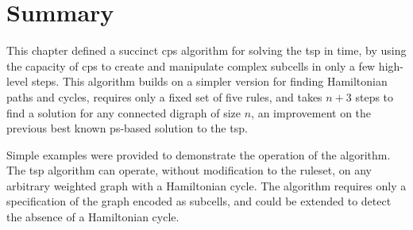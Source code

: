 \section{\label{sec:tsp:conc}Summary}
This chapter defined a succinct \gls{cps} algorithm for solving the \gls{tsp} in  time, by using the capacity of \gls{cps} to create and manipulate complex subcells in only a few high-level steps.  This algorithm builds on a simpler version for finding Hamiltonian paths and cycles, requires only a fixed set of five rules, and takes \(n + 3\) steps to find a solution for any connected digraph of size \(n\), an improvement on the previous best known \gls{ps}-based solution to the \gls{tsp}.

Simple examples were provided to demonstrate the operation of the algorithm.  The \gls{tsp} algorithm can operate, without modification to the \gls{ruleset}, on any arbitrary weighted graph with a Hamiltonian cycle.   The algorithm requires only a specification of the graph encoded as subcells, and could be extended to detect the absence of a Hamiltonian cycle.